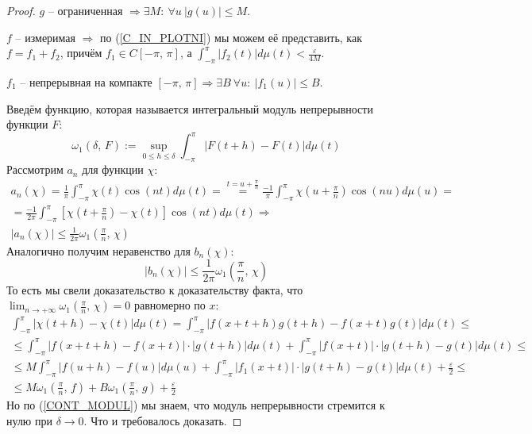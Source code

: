\documentclass[a4paper,12pt]{article}
\renewcommand{\leq}{\ensuremath{\leqslant}}
\theoremstyle{plain}
\theoremstyle{definition}
\theoremstyle{remark}
\begin{document}
\begin{proof}
	$g$ -- ограниченная $\Rightarrow \exists M:\: \forall u \: |g(u)| \leq M$.

	$f$ -- измеримая $\Rightarrow$ по (\ref{C_IN_PLOTNI}) мы можем её представить, как $f = f_1 + f_2$, причём $f_1 \in C[-\pi,\,\pi]$, а $\int_{-\pi}^{\pi} |f_2(t)|d\mu(t) < \frac{\varepsilon}{4M}$.

	$f_1$ -- непрерывная на компакте $[-\pi,\,\pi] \Rightarrow \exists B \: \forall u:\: |f_1(u)| \leq B$.

	Введём функцию, которая называется интегральный модуль непрерывности функции $F$:
	\[\omega_1(\delta,\,F) := \sup_{0 \leq h \leq \delta} \int_{-\pi}^\pi |F(t + h) - F(t)|d\mu(t)\]
	Рассмотрим $a_n$ для функции $\chi$:
	\begin{align*}
		a_n(\chi) = \frac{1}{\pi} \int_{-\pi}^\pi \chi(t)\cos(nt)d\mu(t) = \stackrel{t = u + \frac{\pi}{n}}{=} \frac{-1}{\pi}\int_{-\pi}^\pi \chi\left(u + \frac{\pi}{n}\right)\cos(nu)d\mu(u) = \\
		= \frac{-1}{2\pi}\int_{-\pi}^\pi \left[\chi\left(t + \frac{\pi}{n}\right) - \chi(t)\right]\cos(nt)d\mu(t) \Rightarrow                                                                    \\
		|a_n(\chi)| \leq \frac{1}{2\pi}\omega_1\left(\frac{\pi}{n},\, \chi\right)
	\end{align*}
	Аналогично получим неравенство для $b_n(\chi)$:
	\[|b_n(\chi)| \leq \frac{1}{2\pi}\omega_1\left(\frac{\pi}{n},\,\chi\right)\]
	То есть мы свели доказательство к доказательству факта, что $\lim_{n \to +\infty}\omega_1(\frac{\pi}{n},\,\chi) = 0$ равномерно по $x$:
	\begin{align*}
		\int_{-\pi}^\pi |\chi(t + h) - \chi(t)|d\mu(t) = \int_{-\pi}^\pi |f(x + t + h)g(t + h) - f(x + t)g(t)|d\mu(t) \leq                        \\
		\leq \int_{-\pi}^\pi |f(x + t + h) - f(x + t)|\cdot |g (t + h)|d\mu(t) + \int_{-\pi}^\pi |f(x + t)|\cdot |g(t + h) - g(t)|d\mu(t) \leq    \\
		\leq M \int_{-\pi}^\pi |f(u + h) - f(u)|d\mu(u) +  \int_{-\pi}^\pi |f_1(x + t)|\cdot|g(t + h) - g(t)|d\mu(t) + \frac{\varepsilon}{2} \leq \\
		\leq M \omega_1(\frac{\pi}{n},\, f) + B\omega_1(\frac{\pi}{n},\,g) + \frac{\varepsilon}{2}
	\end{align*}
	Но по (\ref{CONT_MODUL}) мы знаем, что модуль непрерывности стремится к нулю при $\delta \to 0$. Что и требовалось доказать.
\end{proof}
\end{document}
